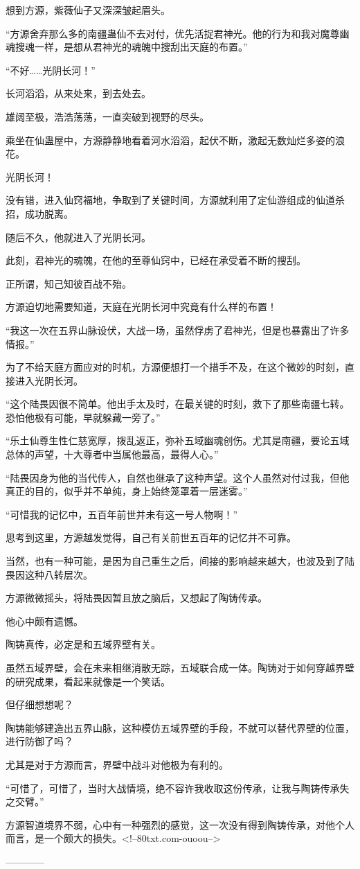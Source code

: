 \begin{this_body}
想到方源，紫薇仙子又深深皱起眉头。

“方源舍弃那么多的南疆蛊仙不去对付，优先活捉君神光。他的行为和我对魔尊幽魂搜魂一样，是想从君神光的魂魄中搜刮出天庭的布置。”

“不好……光阴长河！”

长河滔滔，从来处来，到去处去。

雄阔至极，浩浩荡荡，一直突破到视野的尽头。

乘坐在仙蛊屋中，方源静静地看着河水滔滔，起伏不断，激起无数灿烂多姿的浪花。

光阴长河！

没有错，进入仙窍福地，争取到了关键时间，方源就利用了定仙游组成的仙道杀招，成功脱离。

随后不久，他就进入了光阴长河。

此刻，君神光的魂魄，在他的至尊仙窍中，已经在承受着不断的搜刮。

正所谓，知己知彼百战不殆。

方源迫切地需要知道，天庭在光阴长河中究竟有什么样的布置！

“我这一次在五界山脉设伏，大战一场，虽然俘虏了君神光，但是也暴露出了许多情报。”

为了不给天庭方面应对的时机，方源便想打一个措手不及，在这个微妙的时刻，直接进入光阴长河。

“这个陆畏因很不简单。他出手太及时，在最关键的时刻，救下了那些南疆七转。恐怕他极有可能，早就躲藏一旁了。”

“乐土仙尊生性仁慈宽厚，拨乱返正，弥补五域幽魂创伤。尤其是南疆，要论五域总体的声望，十大尊者中当属他最高，最得人心。”

“陆畏因身为他的当代传人，自然也继承了这种声望。这个人虽然对付过我，但他真正的目的，似乎并不单纯，身上始终笼罩着一层迷雾。”

“可惜我的记忆中，五百年前世并未有这一号人物啊！”

思考到这里，方源越发觉得，自己有关前世五百年的记忆并不可靠。

当然，也有一种可能，是因为自己重生之后，间接的影响越来越大，也波及到了陆畏因这种八转层次。

方源微微摇头，将陆畏因暂且放之脑后，又想起了陶铸传承。

他心中颇有遗憾。

陶铸真传，必定是和五域界壁有关。

虽然五域界壁，会在未来相继消散无踪，五域联合成一体。陶铸对于如何穿越界壁的研究成果，看起来就像是一个笑话。

但仔细想想呢？

陶铸能够建造出五界山脉，这种模仿五域界壁的手段，不就可以替代界壁的位置，进行防御了吗？

尤其是对于方源而言，界壁中战斗对他极为有利的。

“可惜了，可惜了，当时大战情境，绝不容许我收取这份传承，让我与陶铸传承失之交臂。”

方源智道境界不弱，心中有一种强烈的感觉，这一次没有得到陶铸传承，对他个人而言，是一个颇大的损失。<!--80txt.com-ouoou-->

------------

\end{this_body}

